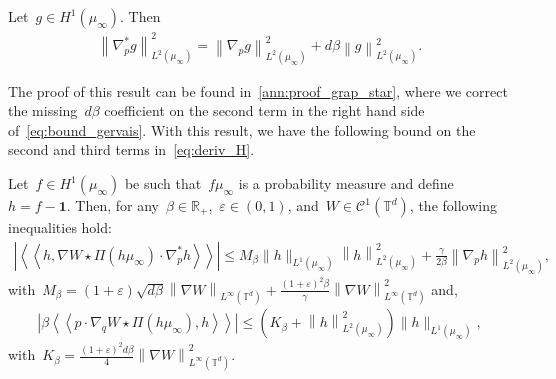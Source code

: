 \documentclass[onefignum,onetabnum]{siamart251216} %
\newcommand{\norm}[1]{\left\lVert#1\right\rVert}
\newcommand{\torus}{\mathbb T}
\newcommand{\real}{\mathbb R}
\newcommand{\mc}[1]{\mathcal{#1}}
\renewcommand{\leq}{\leqslant}
\newcommand{\mescin}{\mu}
\newcommand{\normT}[1]{\norm{#1}_{L^\infty(\torus^d)}}
\newcommand{\projp}{\Pi}
\newcommand{\dblangle}[1]{\left\langle\!\left\langle #1 \right\rangle\!\right\rangle}
\newcommand{\norml}[1]{\norm{#1}_{L^2(\mescin_\infty)}}
\newcommand{\eps}{\varepsilon}
\theoremstyle{plain}
\numberwithin{equation}{section}
\numberwithin{theorem}{section}
\begin{document}
\begin{lemma}{{\cite[Lemma 4.2]{gervais2024well}}}
    \label{lem:gradp_adj}
    Let~$g\in H^1(\mescin_\infty)$. Then
    \begin{align}
        \label{eq:bound_gervais}
        \norml{\nabla_p^* g}^2 = \norml{\nabla_p g}^2 + d\beta \norml{g}^2.
    \end{align}
\end{lemma}
The proof of this result can be found in~\cref{ann:proof_grap_star}, where we correct the missing~$d\beta$ coefficient on the second term in the right hand side of~\eqref{eq:bound_gervais}. With this result, we have the following bound on the second and third terms in~\eqref{eq:deriv_H}.
\begin{proposition}
    \label{lem:bound_deriv_second_H}
    Let~$f \in H^1(\mescin_\infty)$ be such that~$f\mu_\infty$ is a probability measure and define~$h = f-\mathbf{1}$. Then,
    for any~$\beta\in\real_+$,~$\eps \in(0,1)$, and~$W \in \mc{C}^1(\torus^d)$, the following inequalities hold:
        \begin{align}
        \label{eq:bound_deriv_second_H_bis}
        \!\left|\dblangle{h,\nabla W\star\projp(h\mescin_\infty)\cdot \nabla_p^* h}\right|\!
        \leq M_\beta \|h\|_{L^1(\mescin_\infty)} \norml{h}^2
        + \frac{\gamma}{2\beta}\norml{\nabla_p h}^2,
        \end{align}
        with~$M_\beta = (1+\eps)\sqrt{d\beta}\normT{\nabla W} + \displaystyle\frac{(1+\eps)^2\beta}{\gamma} \normT{\nabla W}^2$ and,
        \begin{align}
        \label{eq:new_remainder}
         \left|\beta\dblangle{ p\cdot\nabla_q W \star \projp (h\mescin_\infty), h}\right|
         \leq \left(K_\beta + \norml{h}^2\right)\|h\|_{L^1(\mescin_\infty)},
        \end{align}
        with~$K_\beta = \displaystyle\frac{(1+\eps)^2d\beta}{4}\normT{\nabla W}^2$.
\end{proposition}
\end{document}
